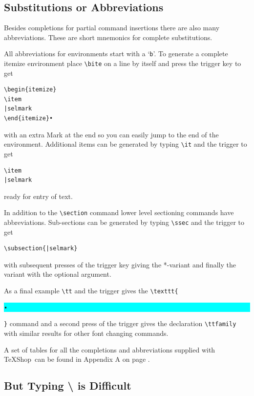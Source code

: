 \documentclass[letterpaper,11pt]{article}
\newcommand{\TS}{\textsf{\TeX Shop}}
\newcommand{\cmd}[1]{\textsf{#1}}
\newcommand{\selmark}{\colorbox{cyan}{\rule[-0.5ex]{0ex}{2.1ex}\texttt{•}}}
\begin{document}
\subsection{Substitutions or Abbreviations}

Besides completions for partial command insertions there are also many abbreviations. These are short mnemonics for complete substitutions. 

All abbreviations for environments start with a `\texttt{b}'. To generate a complete \cmd{itemize} environment place \verb|\bite| on a line by itself and press the trigger key to get
\begin{verbatim}
\begin{itemize}
\item
|selmark
\end{itemize}•
\end{verbatim}
with an extra Mark at the end so you can easily jump to the end of the environment. Additional items can be generated by typing \verb|\it| and the trigger to get
\begin{verbatim}
\item
|selmark
\end{verbatim}
ready for entry of text.

In addition to the \verb|\section| command lower level sectioning commands have abbreviations. Sub-sections can be generated by typing \verb|\ssec| and the trigger to get
\begin{verbatim}
\subsection{|selmark}
\end{verbatim}
with subsequent presses of the trigger key giving the *-variant and finally the variant with the optional argument.

As a final example \verb|\tt| and the trigger gives the \verb|\texttt{|\selmark\verb|}| command and a second press of the trigger gives the declaration \verb|\ttfamily| with similar results for other font changing commands.

A set of tables for all the completions and abbreviations supplied with \TS\ can be found in Appendix A on page \pageref{sec:CCTables}.

\subsection{But Typing \cmd{\textbackslash} is Difficult}
\end{document}
